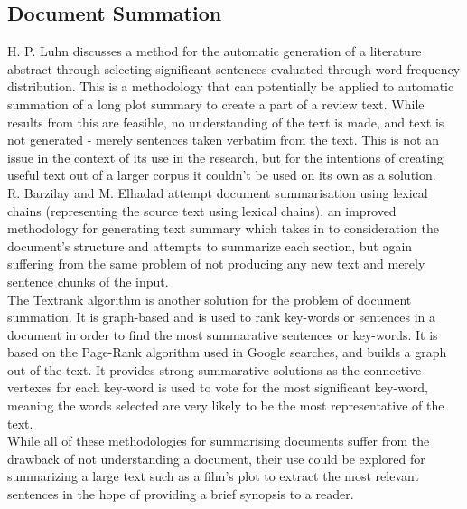 \subsection{Document Summation}
H. P. Luhn discusses a method for the automatic generation of a literature abstract through selecting significant sentences evaluated through word frequency distribution. This is a methodology that can potentially be applied to automatic summation of a long plot summary to create a part of a review text. While results from this are feasible, no understanding of the text is made, and text is not generated - merely sentences taken verbatim from the text. This is not an issue in the context of its use in the research, but for the intentions of creating useful text out of a larger corpus it couldn't be used on its own as a solution.\\
R. Barzilay and M. Elhadad attempt document summarisation using lexical chains (representing the source text using lexical chains), an improved methodology for generating text summary which takes in to consideration the document's structure and attempts to summarize each section, but again suffering from the same problem of not producing any new text and merely sentence chunks of the input.\\

%
The Textrank algorithm is another solution for the problem of document summation. It is graph-based and is used to rank key-words or sentences in a document in order to find the most summarative sentences or key-words. It is based on the Page-Rank algorithm used in Google searches, and builds a graph out of the text. It provides strong summarative solutions as the connective vertexes for each key-word is used to vote for the most significant key-word, meaning the words selected are very likely to be the most representative of the text.\\
While all of these methodologies for summarising documents suffer from the drawback of not understanding a document, their use could be explored for summarizing a large text such as a film's plot to extract the most relevant sentences in the hope of providing a brief synopsis to a reader.
